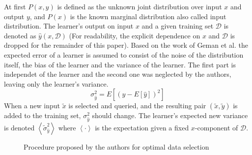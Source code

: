 \documentclass{article}
\newcommand{\D}{\mathcal{D}}
\newcommand{\xt}{\tilde{x}}
\newcommand{\yt}{\tilde{y}}
\newcommand{\st}{\tilde{\sigma}}
\newcommand{\E}[1]{\left< #1 \right>}
\newcommand{\so}{\sigma_{\hat{y}}^2}
\newcommand{\sn}{\left< \tilde{\sigma}_{\hat{y}}^2 \right>}
\begin{document}
At first $P(x,y)$ is defined as the unknown joint distribution over input $x$
and output $y$, and $P(x)$ is the known marginal distribution also called
input distribution. The learner's output on input $x$ and a given training set $\D$
is denoted as $\hat{y}(x,\D)$ (For readability, the explicit dependence on $x$
and $\D$ is dropped for the remainder of this paper).
Based on the work of Geman et al.  the expected error of
a learner is assumed to consist of the noise of the distribution itself,
the bias of the learner and the variance of the learner.
The first part is independet of the learner
and the second one was neglected by the authors, leaving only the learner's
variance.
\begin{equation}
  \so = E \left[\left(\hat{y} - E \left[\hat{y}\right]\right)^2 \right]
\end{equation}
When a new input $\xt$ is selected and queried, and the resulting pair $(\xt,\yt)$
is added to the training set, $\so$ should change.
The learner's expected new variance is denoted $\sn$ where
$\left< \cdot \right>$ is the expectation given a fixed $x$-component of $\D$.

\begin{figure}\centering\small
\caption{Procedure proposed by the authors for optimal data selection}
\label{fig:proc}
\end{figure}
\end{document}
